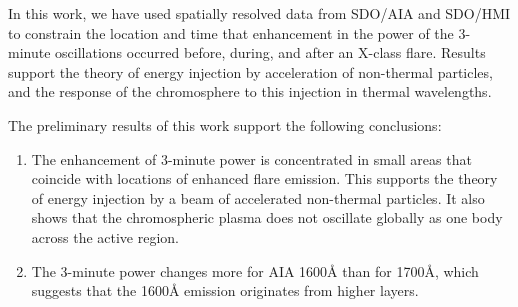 In this work, we have used spatially resolved data from
SDO/AIA and SDO/HMI
to constrain the location and time that enhancement in the power
of the 3-minute oscillations occurred before, during, and after
an X-class flare.
Results support the theory of energy
injection by acceleration of non-thermal particles, and the response
of the chromosphere to this injection in thermal wavelengths.

The preliminary results of this work support the following conclusions:
\begin{enumerate}
    \item The enhancement of 3-minute
        power is concentrated in small areas that coincide with locations
        of enhanced flare emission. This supports the theory of
        energy injection by a beam of accelerated non-thermal particles.
        It also shows that the chromospheric plasma does not oscillate
        globally as one body across the active region.
    \item The 3-minute power changes more for
        AIA 1600\AA{} than for 1700\AA{}, which suggests that the 1600\AA{}
        emission originates from higher layers.
\end{enumerate}


